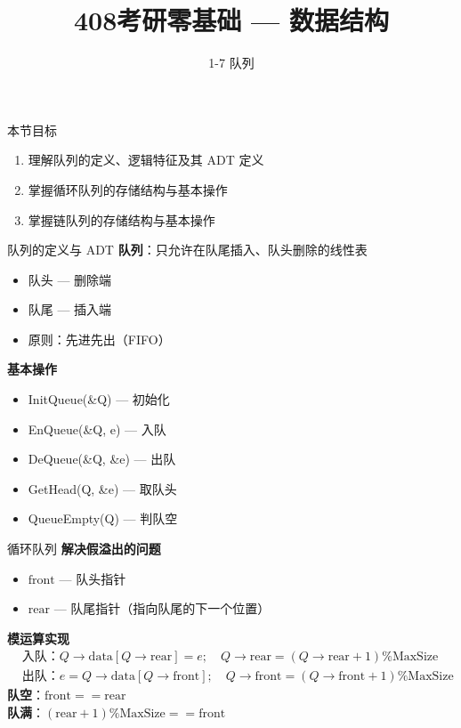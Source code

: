 \documentclass[10pt, aspectratio=169]{beamer}
\title{408考研零基础 --- 数据结构}
\subtitle{1-7 队列}
\author{}
\date{}
\begin{document}
\begin{frame}{本节目标}
    \begin{enumerate}
        \item 理解队列的定义、逻辑特征及其 ADT 定义
        \item 掌握循环队列的存储结构与基本操作
        \item 掌握链队列的存储结构与基本操作
    \end{enumerate}
\end{frame}

\begin{frame}{队列的定义与 ADT}
    \textbf{队列}：只允许在队尾插入、队头删除的线性表
    \begin{itemize}
        \item 队头 --- 删除端
        \item 队尾 --- 插入端
        \item 原则：先进先出（FIFO）
    \end{itemize}
    \vspace{0.5em}
    \textbf{基本操作}
    \begin{itemize}
        \item InitQueue(\&Q) --- 初始化
        \item EnQueue(\&Q, e) --- 入队
        \item DeQueue(\&Q, \&e) --- 出队
        \item GetHead(Q, \&e) --- 取队头
        \item QueueEmpty(Q) --- 判队空
    \end{itemize}
\end{frame}

\begin{frame}{循环队列}
    \textbf{解决假溢出的问题}
    \vspace{0.5em}
    \begin{itemize}
        \item $\text{front}$ --- 队头指针
        \item $\text{rear}$ --- 队尾指针（指向队尾的下一个位置）
    \end{itemize}
    \vspace{0.3em}
    \textbf{模运算实现}
    \[
    \begin{aligned}
    &\text{入队：} Q \to \text{data}[Q \to \text{rear}] = e;\quad Q \to \text{rear} = (Q \to \text{rear} + 1) \% \text{MaxSize}\\
    &\text{出队：} e = Q \to \text{data}[Q \to \text{front}];\quad Q \to \text{front} = (Q \to \text{front} + 1) \% \text{MaxSize}
    \end{aligned}
    \]
    \vspace{0.3em}
    \textbf{队空}：$\text{front} == \text{rear}$ \\
    \textbf{队满}：$(\text{rear} + 1) \% \text{MaxSize} == \text{front}$
\end{frame}
\end{document}
